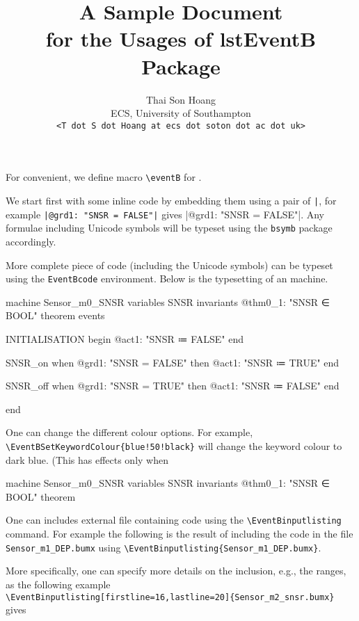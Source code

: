 \usepackage{verbatim}
\usepackage{mdframed}
\title{A Sample Document\\for the Usages of \textsf{lstEventB} Package}
\author{Thai Son Hoang\\ECS, University of Southampton\\\texttt{<T dot S dot Hoang at ecs dot soton dot ac dot uk>}}


\maketitle
For convenient, we define macro \verb|\eventB| for \eventB. 

We start first with some inline \eventB code by embedding them using a pair of \verb$|$, for example \verb$|@grd1: "SNSR = FALSE"|$ gives |@grd1: "SNSR = FALSE"|. Any \eventB formulae including Unicode symbols will be typeset using the \verb|bsymb| package accordingly.

More complete piece of code (including the Unicode symbols) can be typeset using the \verb|EventBcode| environment. Below is the typesetting of an \eventB machine.
\begin{EventBcode}
machine Sensor_m0_SNSR
variables
	SNSR
invariants
	@thm0_1: "SNSR ∈ BOOL" theorem
events

	INITIALISATION
	begin
		@act1: "SNSR ≔ FALSE"
	end

	SNSR_on
	when
		@grd1: "SNSR = FALSE"
	then
		@act1: "SNSR ≔ TRUE"
	end

	SNSR_off
	when
		@grd1: "SNSR = TRUE"
	then
		@act1: "SNSR ≔ FALSE"
	end

end
\end{EventBcode}

One can change the different colour options.  For example, \verb|\EventBSetKeywordColour{blue!50!black}| will change the keyword colour to dark blue. (This has effects only when 
\begin{EventBcode}
machine Sensor_m0_SNSR
variables
	SNSR
invariants
	@thm0_1: "SNSR ∈ BOOL" theorem
\end{EventBcode}

One can includes external file containing \eventB code using the \verb|\EventBinputlisting| command.  For example the following is the result of including the code in the file \verb|Sensor_m1_DEP.bumx| using \verb|\EventBinputlisting{Sensor_m1_DEP.bumx}|.

More specifically, one can specify more details on the inclusion, e.g., the ranges, as the following example\\
\verb|\EventBinputlisting[firstline=16,lastline=20]{Sensor_m2_snsr.bumx}|
gives



